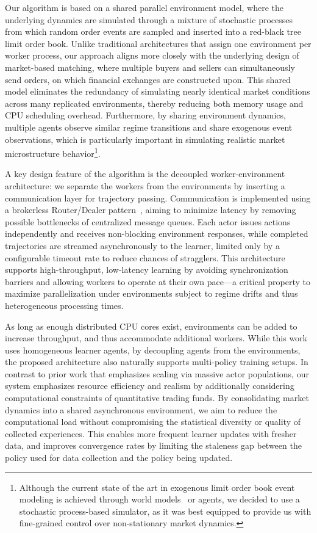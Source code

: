 Our algorithm is based on a shared parallel environment model, where the underlying dynamics are simulated
through a mixture of stochastic processes from which random order events are sampled and inserted into a red-black tree limit order book.
Unlike traditional architectures that assign one environment per worker process,
our approach aligns more closely with the underlying design of market-based matching,
where multiple buyers and sellers can simultaneously send orders, on which financial exchanges are constructed upon.
This shared model eliminates the redundancy of simulating nearly identical market conditions across many replicated environments,
thereby reducing both memory usage and CPU scheduling overhead.
Furthermore, by sharing environment dynamics, multiple agents observe similar regime transitions and share exogenous event observations,
which is particularly important in simulating realistic market microstructure behavior\footnote{
    Although the current state of the art in exogenous limit order book event modeling 
    is achieved through world models~\citep{Coletta2022} or agents,
    we decided to use a stochastic process-based simulator, 
    as it was best equipped to provide us with fine-grained control over non-stationary market dynamics.
}.

A key design feature of the algorithm is the decoupled worker-environment architecture:
we separate the workers from the environments by inserting a communication layer for trajectory passing.
Communication is implemented using a brokerless Router/Dealer pattern~\citep{Hintjens2013}, aiming to minimize latency by
removing possible bottlenecks of centralized message queues.
Each actor issues actions independently and receives non-blocking environment responses,
while completed trajectories are streamed asynchronously to the learner,
limited only by a configurable timeout rate to reduce chances of stragglers.
This architecture supports high-throughput, low-latency learning by avoiding synchronization barriers and
allowing workers to operate at their own pace---a critical property to maximize parallelization under 
environments subject to regime drifts and thus heterogeneous processing times.

As long as enough distributed CPU cores exist, environments can be added to increase throughput, and thus accommodate additional workers.
While this work uses homogeneous learner agents, by decoupling agents from the environments, 
the proposed architecture also naturally supports multi-policy training setups.
In contrast to prior work that emphasizes scaling via massive actor populations,
our system emphasizes resource efficiency and realism by additionally considering computational constraints of quantitative trading funds.
By consolidating market dynamics into a shared asynchronous environment,
we aim to reduce the computational load without compromising the statistical diversity or quality of collected experiences.
This enables more frequent learner updates with fresher data, and improves convergence rates by limiting the staleness gap
between the policy used for data collection and the policy being updated.

